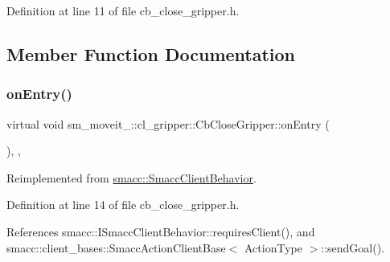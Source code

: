 Definition at line 11 of file cb\+\_\+close\+\_\+gripper.\+h.



\subsection{Member Function Documentation}
\mbox{\label{classsm__moveit__4_1_1cl__gripper_1_1CbCloseGripper_ada79ea2869c0297ced61d086bb8def81}} 
\subsubsection{\texorpdfstring{on\+Entry()}{onEntry()}}
{\footnotesize\ttfamily virtual void sm\+\_\+moveit\+\_\+::cl\+\_\+gripper\+::\+Cb\+Close\+Gripper\+::on\+Entry (\begin{DoxyParamCaption}{ }\end{DoxyParamCaption})\hspace{0.3cm}{\ttfamily [inline]}, {\ttfamily [override]}, {\ttfamily [virtual]}}



Reimplemented from \hyperlink{classsmacc_1_1SmaccClientBehavior_ad5d3e1f1697c3cfe66c94cadba948493}{smacc\+::\+Smacc\+Client\+Behavior}.



Definition at line 14 of file cb\+\_\+close\+\_\+gripper.\+h.



References smacc\+::\+I\+Smacc\+Client\+Behavior\+::requires\+Client(), and smacc\+::client\+\_\+bases\+::\+Smacc\+Action\+Client\+Base$<$ Action\+Type $>$\+::send\+Goal().


